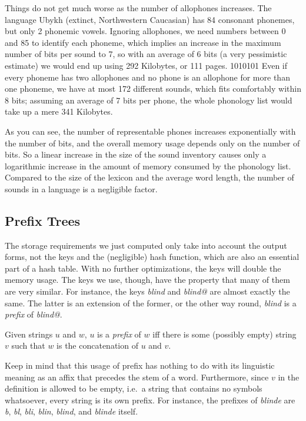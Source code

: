 Things do not get much worse as the number of allophones increases.
The language Ubykh (extinct, Northwestern Caucasian) has 84 consonant phonemes, but only 2 phonemic vowels.
Ignoring allophones, we need numbers between 0 and 85 to identify each phoneme, which implies an increase in the maximum number of bits per sound to 7, so with an average of 6 bits (a very pessimistic estimate) we would end up using 292 Kilobytes, or 111 pages.
1010101
Even if every phoneme has two allophones and no phone is an allophone for more than one phoneme, we have at most 172 different sounds, which fits comfortably within 8 bits; assuming an average of 7 bits per phone, the whole phonology list would take up a mere 341 Kilobytes.

As you can see, the number of representable phones increases exponentially with the number of bits, and the overall memory usage depends only on the number of bits. 
So a linear increase in the size of the sound inventory causes only a logarithmic increase in the amount of memory consumed by the phonology list.
Compared to the size of the lexicon and the average word length, the number of sounds in a language is a negligible factor.

\subsection{Prefix Trees}

The storage requirements we just computed only take into account the output forms, not the keys and the (negligible) hash function, which are also an essential part of a hash table.
With no further optimizations, the keys will double the memory usage.
The keys we use, though, have the property that many of them are very similar.
For instance, the keys \emph{blind} and \emph{blind@} are almost exactly the same.
The latter is an extension of the former, or the other way round, \emph{blind} is a \emph{prefix} of \emph{blind@}.
%
\begin{definition}[Prefix]
    Given strings $u$ and $w$, $u$ is a \emph{prefix} of $w$ iff there is some (possibly empty) string $v$ such that $w$ is the concatenation of $u$ and $v$.
\end{definition}
%
Keep in mind that this usage of prefix has nothing to do with its linguistic meaning as an affix that precedes the stem of a word.
Furthermore, since $v$ in the definition is allowed to be empty, i.e.\ a string that contains no symbols whatsoever, every string is its own prefix.
For instance, the prefixes of \emph{blinde} are \emph{b}, \emph{bl}, \emph{bli}, \emph{blin}, \emph{blind}, and \emph{blinde} itself.

